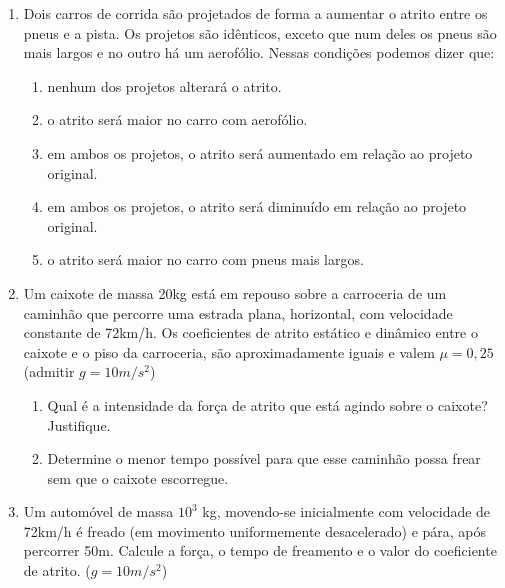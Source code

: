 \documentclass[12pt,letterpaper,fleqn]{article}
\begin{document}
\begin{itemize}
\begin{enumerate}
\item Dois carros de corrida são projetados de forma a aumentar o atrito entre os pneus e a pista. Os projetos são idênticos, exceto que num deles os pneus são mais largos e no outro há um aerofólio. Nessas condições podemos dizer que:

\begin{enumerate}
    \item nenhum dos projetos alterará o atrito.
    \item o atrito será maior no carro com aerofólio.
    \item em ambos os projetos, o atrito será aumentado em relação ao projeto original.
    \item em ambos os projetos, o atrito será diminuído em relação ao projeto original.
    \item o atrito será maior no carro com pneus mais largos.
\end{enumerate}

\item Um caixote de massa 20kg está em repouso sobre a carroceria de um caminhão que percorre uma estrada plana, horizontal, com velocidade constante de 72km/h. Os coeficientes de atrito estático e dinâmico entre o caixote e o piso da carroceria, são aproximadamente iguais e valem $\mu=0,25$ (admitir $g=10m/s^2$)

\begin{enumerate}
    \item Qual é a intensidade da força de atrito que está agindo sobre o caixote? Justifique.
    \item Determine o menor tempo possível para que esse caminhão possa frear sem que o caixote escorregue.
\end{enumerate}

\item Um automóvel de massa $10^3$ kg, movendo-se inicialmente com velocidade de 72km/h é freado (em movimento uniformemente desacelerado) e pára, após percorrer 50m. Calcule a força, o tempo de freamento e o valor do coeficiente de atrito. ($g=10m/s^2$)

    \end{enumerate}
\end{itemize}
\newpage
\end{document}

